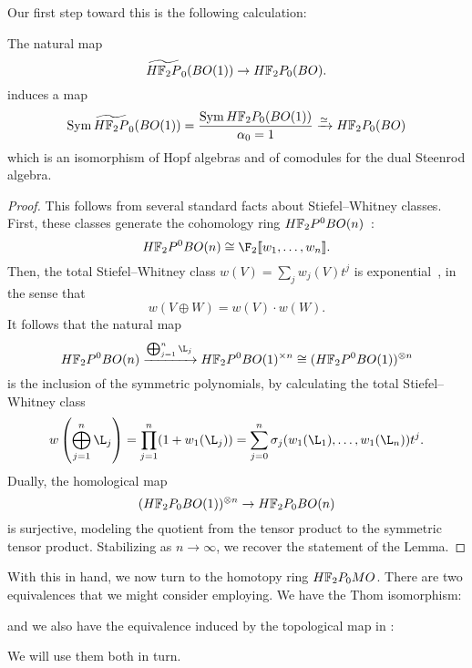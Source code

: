 Our first step toward this is the following calculation:
\begin{lemma}\label{HF2BOIsSymAlg}
The natural map \[\widetilde{\HFtwo P}_0(BO(1)) \to \HFtwo P_0(BO).\] induces a map \[\Sym \widetilde{\HFtwo P}_0(BO(1)) = \frac{\Sym \HFtwo P_0(BO(1))}{\alpha_0 = 1} \xrightarrow{\simeq} \HFtwo P_0(BO)\] which is an isomorphism of Hopf algebras and of comodules for the dual Steenrod algebra.
\end{lemma}
\begin{proof}
This follows from several standard facts about Stiefel--Whitney classes.  First, these classes generate the cohomology ring \(\HFtwo P^0 BO(n)\)~\cite[Theorem 16.10]{Switzer}: \[\HFtwo P^0 BO(n) \cong \F_2\ps{w_1, \ldots, w_n}.\]  Then, the total Stiefel--Whitney class \(w(V) = \sum_j w_j(V) t^j\) is exponential~\cite[Theorem 16.3]{Switzer}, in the sense that \[w(V \oplus W) = w(V) \cdot w(W).\]  It follows that the natural map \[\HFtwo P^0 BO(n) \xrightarrow{\bigoplus_{j=1}^n \L_j} \HFtwo P^0 BO(1)^{\times n} \cong (\HFtwo P^0 BO(1))^{\otimes n}\] is the inclusion of the symmetric polynomials, by calculating the total Stiefel--Whitney class \[w\left( \bigoplus_{j=1}^n \L_j \right) = \prod_{j=1}^n (1 + w_1(\L_j)) = \sum_{j=0}^n \sigma_j(w_1(\L_1), \ldots, w_1(\L_n)) t^j.\]  Dually, the homological map \[(\HFtwo P_0 BO(1))^{\otimes n} \to \HFtwo P_0 BO(n)\] is surjective, modeling the quotient from the tensor product to the symmetric tensor product.  Stabilizing as \(n \to \infty\), we recover the statement of the Lemma.
\end{proof}

With this in hand, we now turn to the homotopy ring \(\HFtwo P_0 MO\).  There are two equivalences that we might consider employing.  We have the Thom isomorphism:
\begin{center}
\end{center}
and we also have the equivalence induced by the topological map in :
\begin{center}
\end{center}
We will use them both in turn.

